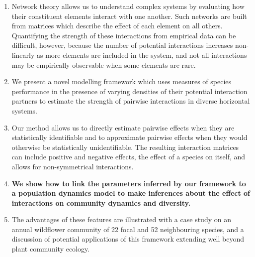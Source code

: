 \documentclass[a4,12pt]{article}
\begin{document}
    \begin{enumerate}
    \item{Network theory allows us to understand complex systems by evaluating how their constituent elements interact with one another. Such networks are built from matrices which describe the effect of each element on all others. Quantifying the strength of these interactions from empirical data can be difficult, however, because the number of potential interactions increases non-linearly as more elements are included in the system, and not all interactions may be empirically observable when some elements are rare.}
    \item{We present a novel modelling framework which uses measures of species performance in the presence of varying densities of their potential interaction partners to estimate the strength of pairwise interactions in diverse horizontal systems.}
    \item{Our method allows us to directly estimate pairwise effects when they are statistically identifiable and to approximate pairwise effects when they would otherwise be statistically unidentifiable. The resulting interaction matrices can include positive and negative effects, the effect of a species on itself, and allows for non-symmetrical interactions.}
    \item{\textbf{We show how to link the parameters inferred by our framework to a population dynamics model to make inferences about the effect of interactions on community dynamics and diversity.}}
    \item{The advantages of these features are illustrated with a case study on an annual wildflower community of 22 focal and 52 neighbouring species, and a discussion of potential applications of this framework extending well beyond plant community ecology.}
\end{enumerate}
\end{document}
